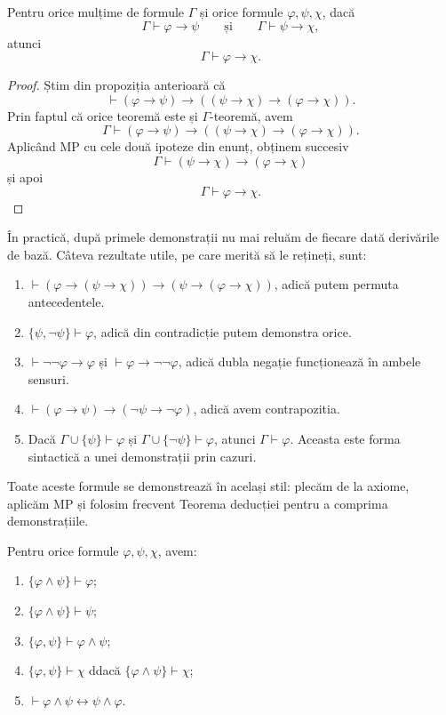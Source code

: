 \begin{prop}
	Pentru orice mulțime de formule \( \Gamma \) și orice formule \( \varphi, \psi, \chi \), dacă
	\[
		\Gamma \vdash \varphi \to \psi \qquad \text{și} \qquad \Gamma \vdash \psi \to \chi,
	\]
	atunci
	\[
		\Gamma \vdash \varphi \to \chi.
	\]
\end{prop}

\begin{proof}
	Știm din propoziția anterioară că
	\[
		\vdash (\varphi \to \psi) \to ((\psi \to \chi) \to (\varphi \to \chi)).
	\]
	Prin faptul că orice teoremă este și \( \Gamma \)-teoremă, avem
	\[
		\Gamma \vdash (\varphi \to \psi) \to ((\psi \to \chi) \to (\varphi \to \chi)).
	\]
	Aplicând MP cu cele două ipoteze din enunț, obținem succesiv
	\[
		\Gamma \vdash (\psi \to \chi) \to (\varphi \to \chi)
	\]
	și apoi
	\[
		\Gamma \vdash \varphi \to \chi.
	\]
\end{proof}

\begin{note}
	În practică, după primele demonstrații nu mai reluăm de fiecare dată derivările de bază. Câteva rezultate utile, pe care merită să le rețineți, sunt:

	\begin{enumerate}
		\item \( \vdash (\varphi \to (\psi \to \chi)) \to (\psi \to (\varphi \to \chi)) \), adică putem permuta antecedentele.
		\item \( \{\psi, \neg \psi\} \vdash \varphi \), adică din contradicție putem demonstra orice.
		\item \( \vdash \neg\neg \varphi \to \varphi \) și \( \vdash \varphi \to \neg\neg \varphi \), adică dubla negație funcționează în ambele sensuri.
		\item \( \vdash (\varphi \to \psi) \to (\neg \psi \to \neg \varphi) \), adică avem contrapozitia.
		\item Dacă \( \Gamma \cup \{\psi\} \vdash \varphi \) și \( \Gamma \cup \{\neg \psi\} \vdash \varphi \), atunci \( \Gamma \vdash \varphi \). Aceasta este forma sintactică a unei demonstrații prin cazuri.
	\end{enumerate}

	Toate aceste formule se demonstrează în același stil: plecăm de la axiome, aplicăm MP și folosim frecvent Teorema deducției pentru a comprima demonstrațiile.
\end{note}

\begin{prop}
	Pentru orice formule \( \varphi, \psi, \chi \), avem:
	\begin{enumerate}
		\item \( \{\varphi \land \psi\} \vdash \varphi \);
		\item \( \{\varphi \land \psi\} \vdash \psi \);
		\item \( \{\varphi, \psi\} \vdash \varphi \land \psi \);
		\item \( \{\varphi, \psi\} \vdash \chi \) ddacă \( \{\varphi \land \psi\} \vdash \chi \);
		\item \( \vdash \varphi \land \psi \leftrightarrow \psi \land \varphi \).
	\end{enumerate}
\end{prop}

